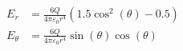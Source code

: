 \documentclass{article}
\begin{document}

\addtocounter{equation}{0}
\begin{align}
    E_r &= \frac{6 Q}{4\pi\varepsilon_0 r^{4}} \left(1.5 \cos^{2}{\left (\theta \right )} - 0.5\right) \\
    E_\theta &= \frac{6 Q}{4\pi\varepsilon_0 r^{4}} \sin{\left (\theta \right )} \cos{\left (\theta \right )}
\end{align}
\end{document}
